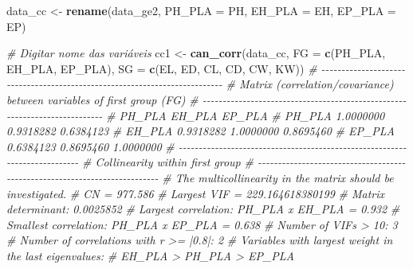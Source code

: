 \documentclass[
]{book}
\newenvironment{Shaded}{\begin{snugshade}}{\end{snugshade}}
\newcommand{\CommentTok}[1]{\textcolor[rgb]{0.56,0.35,0.01}{\textit{#1}}}
\newcommand{\DataTypeTok}[1]{\textcolor[rgb]{0.13,0.29,0.53}{#1}}
\newcommand{\KeywordTok}[1]{\textcolor[rgb]{0.13,0.29,0.53}{\textbf{#1}}}
\newcommand{\NormalTok}[1]{#1}
\newcommand{\StringTok}[1]{\textcolor[rgb]{0.31,0.60,0.02}{#1}}
\numberwithin{equation}{section}
\begin{document}
\begin{Shaded}
\begin{Highlighting}[]
\NormalTok{data\_cc \textless{}{-}}\StringTok{ }
\StringTok{  }\KeywordTok{rename}\NormalTok{(data\_ge2,}
         \DataTypeTok{PH\_PLA =}\NormalTok{ PH,}
         \DataTypeTok{EH\_PLA =}\NormalTok{ EH,}
         \DataTypeTok{EP\_PLA =}\NormalTok{ EP)}

\CommentTok{\# Digitar nome das variáveis}
\NormalTok{cc1 \textless{}{-}}\StringTok{ }
\StringTok{  }\KeywordTok{can\_corr}\NormalTok{(data\_cc,}
           \DataTypeTok{FG =} \KeywordTok{c}\NormalTok{(PH\_PLA, EH\_PLA, EP\_PLA),}
           \DataTypeTok{SG =} \KeywordTok{c}\NormalTok{(EL, ED, CL, CD, CW, KW))}
\CommentTok{\# {-}{-}{-}{-}{-}{-}{-}{-}{-}{-}{-}{-}{-}{-}{-}{-}{-}{-}{-}{-}{-}{-}{-}{-}{-}{-}{-}{-}{-}{-}{-}{-}{-}{-}{-}{-}{-}{-}{-}{-}{-}{-}{-}{-}{-}{-}{-}{-}{-}{-}{-}{-}{-}{-}{-}{-}{-}{-}{-}{-}{-}{-}{-}{-}{-}{-}{-}{-}{-}{-}{-}{-}{-}{-}{-}}
\CommentTok{\# Matrix (correlation/covariance) between variables of first group (FG)}
\CommentTok{\# {-}{-}{-}{-}{-}{-}{-}{-}{-}{-}{-}{-}{-}{-}{-}{-}{-}{-}{-}{-}{-}{-}{-}{-}{-}{-}{-}{-}{-}{-}{-}{-}{-}{-}{-}{-}{-}{-}{-}{-}{-}{-}{-}{-}{-}{-}{-}{-}{-}{-}{-}{-}{-}{-}{-}{-}{-}{-}{-}{-}{-}{-}{-}{-}{-}{-}{-}{-}{-}{-}{-}{-}{-}{-}{-}}
\CommentTok{\#           PH\_PLA    EH\_PLA    EP\_PLA}
\CommentTok{\# PH\_PLA 1.0000000 0.9318282 0.6384123}
\CommentTok{\# EH\_PLA 0.9318282 1.0000000 0.8695460}
\CommentTok{\# EP\_PLA 0.6384123 0.8695460 1.0000000}
\CommentTok{\# {-}{-}{-}{-}{-}{-}{-}{-}{-}{-}{-}{-}{-}{-}{-}{-}{-}{-}{-}{-}{-}{-}{-}{-}{-}{-}{-}{-}{-}{-}{-}{-}{-}{-}{-}{-}{-}{-}{-}{-}{-}{-}{-}{-}{-}{-}{-}{-}{-}{-}{-}{-}{-}{-}{-}{-}{-}{-}{-}{-}{-}{-}{-}{-}{-}{-}{-}{-}{-}{-}{-}{-}{-}{-}{-}}
\CommentTok{\# Collinearity within first group }
\CommentTok{\# {-}{-}{-}{-}{-}{-}{-}{-}{-}{-}{-}{-}{-}{-}{-}{-}{-}{-}{-}{-}{-}{-}{-}{-}{-}{-}{-}{-}{-}{-}{-}{-}{-}{-}{-}{-}{-}{-}{-}{-}{-}{-}{-}{-}{-}{-}{-}{-}{-}{-}{-}{-}{-}{-}{-}{-}{-}{-}{-}{-}{-}{-}{-}{-}{-}{-}{-}{-}{-}{-}{-}{-}{-}{-}{-}}
\CommentTok{\# The multicollinearity in the matrix should be investigated.}
\CommentTok{\# CN = 977.586}
\CommentTok{\# Largest VIF = 229.164618380199}
\CommentTok{\# Matrix determinant: 0.0025852 }
\CommentTok{\# Largest correlation: PH\_PLA x EH\_PLA = 0.932 }
\CommentTok{\# Smallest correlation: PH\_PLA x EP\_PLA = 0.638 }
\CommentTok{\# Number of VIFs \textgreater{} 10: 3 }
\CommentTok{\# Number of correlations with r \textgreater{}= |0.8|: 2 }
\CommentTok{\# Variables with largest weight in the last eigenvalues: }
\CommentTok{\# EH\_PLA \textgreater{} PH\_PLA \textgreater{} EP\_PLA }

\end{Highlighting}
\end{Shaded}
\end{document}

